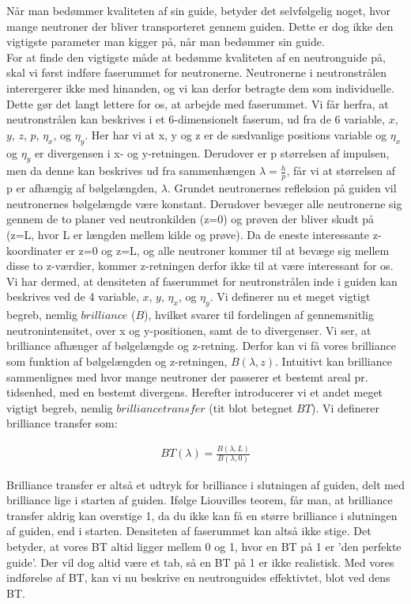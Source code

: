 \documentclass[12pt,oneside,a4paper]{article}
\begin{document}
{{{{{Når man bedømmer kvaliteten af sin guide, betyder det selvfølgelig noget, hvor mange neutroner der bliver transporteret gennem guiden. Dette er dog ikke den vigtigste parameter man kigger på, når man bedømmer sin guide. 
\\
For at finde den vigtigste måde at bedømme kvaliteten af en neutronguide på, skal vi først indføre faserummet for neutronerne. Neutronerne i neutronstrålen interergerer ikke med hinanden, og vi kan derfor betragte dem som individuelle. Dette gør det langt lettere for os, at arbejde med faserummet. Vi får herfra, at neutronstrålen kan beskrives i et 6-dimensionelt faserum, ud fra de 6 variable, $x$, $y$, $z$, $p$, $\eta_x$, og $\eta_y$. Her har vi at x, y og z er de sædvanlige positions variable og $\eta_x$ og $\eta_y$ er divergensen i x- og y-retningen. Derudover er p størrelsen af impulsen, men da denne kan beskrives ud fra sammenhængen $\lambda=\frac{h}{p}$, får vi at størrelsen af p er afhængig af bølgelængden, $\lambda$. Grundet neutronernes refleksion på guiden vil neutronernes bølgelængde være konstant. Derudover bevæger alle neutronerne sig gennem de to planer ved neutronkilden (z=0) og prøven der bliver skudt på (z=L, hvor L er længden mellem kilde og prøve). Da de eneste interessante z-koordinater er z=0 og z=L, og alle neutroner kommer til at bevæge sig mellem disse to z-værdier, kommer z-retningen derfor ikke til at være interessant for os. Vi har dermed, at densiteten af faserummet for neutronstrålen inde i guiden kan beskrives ved de 4 variable,  $x$, $y$, $\eta_x$, og $\eta_y$. Vi definerer nu et meget vigtigt begreb, nemlig $brilliance$ ($B$), hvilket svarer til fordelingen af gennemsnitlig neutronintensitet, over x og y-positionen, samt de to divergenser. Vi ser, at brilliance afhænger af bølgelængde og z-retning. Derfor kan vi få vores brilliance som funktion af bølgelængden og z-retningen, $B(\lambda,z)$. Intuitivt kan brilliance sammenlignes med hvor mange neutroner der passerer et bestemt areal pr. tidsenhed, med en bestemt divergens. Herefter introducerer vi et andet meget vigtigt begreb, nemlig $brilliance transfer$ (tit blot betegnet $BT$). Vi definerer brilliance transfer som:

\begin{align}
BT(\lambda)=\frac{B(\lambda, L)}{B(\lambda,0)}
\end{align}

Brilliance transfer er altså et udtryk for brilliance i slutningen af guiden, delt med brilliance lige i starten af guiden. Ifølge Liouvilles teorem, får man, at brilliance transfer aldrig kan overstige 1, da du ikke kan få en større brilliance i slutningen af guiden, end i starten. Densiteten af faserummet kan altså ikke stige. Det betyder, at vores BT altid ligger mellem 0 og 1, hvor en BT på 1 er 'den perfekte guide'. Der vil dog altid være et tab, så en BT på 1 er ikke realistisk. Med vores indførelse af BT, kan vi nu beskrive en neutronguides effektivtet, blot ved dens BT. \cite{report:ess_optimizations}





}}}}}
\end{document}

